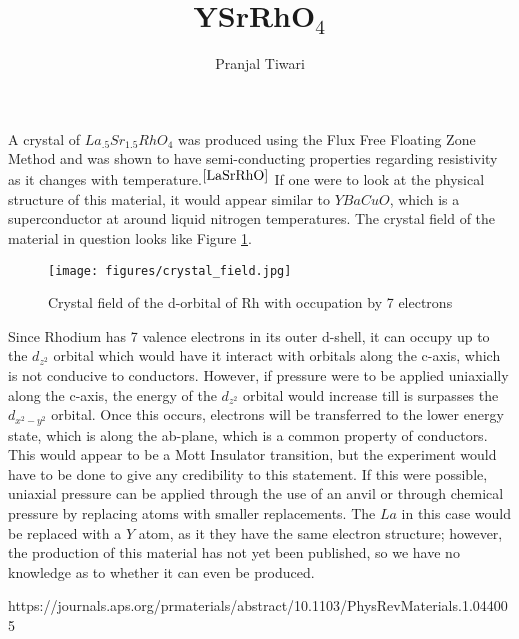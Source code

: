 \documentclass[garamond]{article}
\title{YSrRhO$_4$}
\author{Pranjal Tiwari}
\begin{document}
\maketitle

A crystal of $La_{.5}Sr_{1.5}RhO_4$ was produced using the Flux Free Floating Zone Method and was shown to have semi-conducting properties regarding resistivity as it changes with temperature.$^{\cite{LaSrRhO}}$ If one were to look at the physical structure of this material, it would appear similar to $YBaCuO$, which is a superconductor at around liquid nitrogen temperatures. The crystal field of the material in question looks like Figure \ref{fig:1}.

\begin{figure}[ht]
	\begin{center}
		\texttt{[image: figures/crystal\_field.jpg]}
		\caption{Crystal field of the d-orbital of Rh with occupation by 7 electrons}
		\label{fig:1}
	\end{center}
\end{figure}

Since Rhodium has 7 valence electrons in its outer d-shell, it can occupy up to the $d_{z^2}$ orbital which would have it interact with orbitals along the c-axis, which is not conducive to conductors. However, if pressure were to be applied uniaxially along the c-axis, the energy of the $d_{z^2}$ orbital would increase till is surpasses the $d_{x^2-y^2}$ orbital. Once this occurs, electrons will be transferred to the lower energy state, which is along the ab-plane, which is a common property of conductors.\\

This would appear to be a Mott Insulator transition, but the experiment would have to be done to give any credibility to this statement. If this were possible, uniaxial pressure can be applied through the use of an anvil or through chemical pressure by replacing atoms with smaller replacements. The $La$ in this case would be replaced with a $Y$ atom, as it they have the same electron structure; however, the production of this material has not yet been published, so we have no knowledge as to whether it can even be produced. 

\begin{thebibliography}{9}
	https://journals.aps.org/prmaterials/abstract/10.1103/PhysRevMaterials.1.044005
\end{thebibliography}
\end{document}
